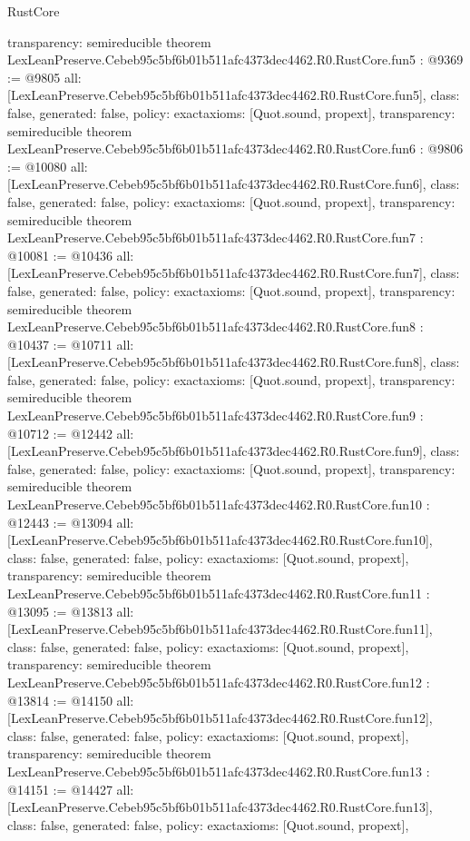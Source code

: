 \begin{lexlean}{RustCore}
\begin{coremodule}
{  transparency: semireducible
}
theorem LexLeanPreserve.Cebeb95c5bf6b01b511afc4373dec4462.R0.RustCore.fun5 : @9369 := @9805 {
  all: [LexLeanPreserve.Cebeb95c5bf6b01b511afc4373dec4462.R0.RustCore.fun5],
  class: false,
  generated: false,
  policy: exact{axioms: [Quot.sound, propext]},
  transparency: semireducible
}
theorem LexLeanPreserve.Cebeb95c5bf6b01b511afc4373dec4462.R0.RustCore.fun6 : @9806 := @10080 {
  all: [LexLeanPreserve.Cebeb95c5bf6b01b511afc4373dec4462.R0.RustCore.fun6],
  class: false,
  generated: false,
  policy: exact{axioms: [Quot.sound, propext]},
  transparency: semireducible
}
theorem LexLeanPreserve.Cebeb95c5bf6b01b511afc4373dec4462.R0.RustCore.fun7 : @10081 := @10436 {
  all: [LexLeanPreserve.Cebeb95c5bf6b01b511afc4373dec4462.R0.RustCore.fun7],
  class: false,
  generated: false,
  policy: exact{axioms: [Quot.sound, propext]},
  transparency: semireducible
}
theorem LexLeanPreserve.Cebeb95c5bf6b01b511afc4373dec4462.R0.RustCore.fun8 : @10437 := @10711 {
  all: [LexLeanPreserve.Cebeb95c5bf6b01b511afc4373dec4462.R0.RustCore.fun8],
  class: false,
  generated: false,
  policy: exact{axioms: [Quot.sound, propext]},
  transparency: semireducible
}
theorem LexLeanPreserve.Cebeb95c5bf6b01b511afc4373dec4462.R0.RustCore.fun9 : @10712 := @12442 {
  all: [LexLeanPreserve.Cebeb95c5bf6b01b511afc4373dec4462.R0.RustCore.fun9],
  class: false,
  generated: false,
  policy: exact{axioms: [Quot.sound, propext]},
  transparency: semireducible
}
theorem LexLeanPreserve.Cebeb95c5bf6b01b511afc4373dec4462.R0.RustCore.fun10 : @12443 := @13094 {
  all: [LexLeanPreserve.Cebeb95c5bf6b01b511afc4373dec4462.R0.RustCore.fun10],
  class: false,
  generated: false,
  policy: exact{axioms: [Quot.sound, propext]},
  transparency: semireducible
}
theorem LexLeanPreserve.Cebeb95c5bf6b01b511afc4373dec4462.R0.RustCore.fun11 : @13095 := @13813 {
  all: [LexLeanPreserve.Cebeb95c5bf6b01b511afc4373dec4462.R0.RustCore.fun11],
  class: false,
  generated: false,
  policy: exact{axioms: [Quot.sound, propext]},
  transparency: semireducible
}
theorem LexLeanPreserve.Cebeb95c5bf6b01b511afc4373dec4462.R0.RustCore.fun12 : @13814 := @14150 {
  all: [LexLeanPreserve.Cebeb95c5bf6b01b511afc4373dec4462.R0.RustCore.fun12],
  class: false,
  generated: false,
  policy: exact{axioms: [Quot.sound, propext]},
  transparency: semireducible
}
theorem LexLeanPreserve.Cebeb95c5bf6b01b511afc4373dec4462.R0.RustCore.fun13 : @14151 := @14427 {
  all: [LexLeanPreserve.Cebeb95c5bf6b01b511afc4373dec4462.R0.RustCore.fun13],
  class: false,
  generated: false,
  policy: exact{axioms: [Quot.sound, propext]},
}
\end{coremodule}
\end{lexlean}
